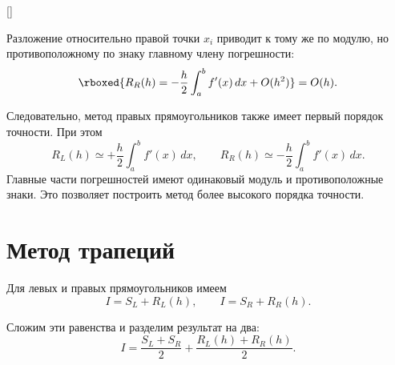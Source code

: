 \documentclass[../final.tex]{subfiles}
\begin{document}
\begin{rbox}[left=18pt,right=18pt,top=14pt,bottom=10pt]{[]}

    \label{fig:ovf_right_rectangles}
\end{rbox}

Разложение относительно правой точки $x_i$ приводит к тому же по
модулю, но противоположному по знаку главному члену погрешности:
%
\begin{equation*}
    \rboxed{
    R_R(h)
    =
    -\frac{h}{2}\int_a^b f'(x)\,dx
    +O(h^2)
    }
    =O(h).
\end{equation*}

Следовательно, метод правых прямоугольников также имеет первый
порядок точности. При этом
%
\begin{equation*}
    R_L(h)
    \simeq
    +\frac{h}{2}\int_a^b f'(x)\,dx,
    \qquad
    R_R(h)
    \simeq
    -\frac{h}{2}\int_a^b f'(x)\,dx.
\end{equation*}
%
Главные части погрешностей имеют одинаковый модуль и противоположные
знаки. Это позволяет построить метод более высокого порядка точности.


\section{Метод трапеций}

Для левых и правых прямоугольников имеем
%
\begin{equation*}
    I=S_L+R_L(h),
    \qquad
    I=S_R+R_R(h).
\end{equation*}

Сложим эти равенства и разделим результат на два:
%
\begin{equation*}
    I
    =
    \frac{S_L+S_R}{2}
    +
    \frac{R_L(h)+R_R(h)}{2}.
\end{equation*}
\end{document}
